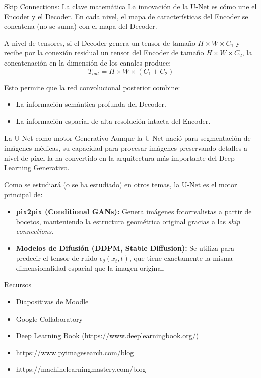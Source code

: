 \begin{frame}{Skip Connections: La clave matemática}
La innovación de la U-Net es cómo une el Encoder y el Decoder. En cada nivel, el mapa de características del Encoder se \alert{concatena} (no se suma) con el mapa del Decoder.

A nivel de tensores, si el Decoder genera un tensor de tamaño $H \times W \times C_1$ y recibe por la conexión residual un tensor del Encoder de tamaño $H \times W \times C_2$, la concatenación en la dimensión de los canales produce:
\begin{equation}
    T_{out} = H \times W \times (C_1 + C_2)
\end{equation}

Esto permite que la red convolucional posterior combine:
\begin{itemize}
    \item La información \alert{semántica profunda} del Decoder.
    \item La información \alert{espacial de alta resolución} intacta del Encoder.
\end{itemize}
\end{frame}

\begin{frame}{La U-Net como motor Generativo}
Aunque la U-Net nació para segmentación de imágenes médicas, su capacidad para procesar imágenes preservando detalles a nivel de píxel la ha convertido en la arquitectura más importante del \alert{Deep Learning Generativo}.

Como se estudiará (o se ha estudiado) en otros temas, la U-Net es el motor principal de:
\begin{itemize}
    \item \textbf{pix2pix (Conditional GANs):} Genera imágenes fotorrealistas a partir de bocetos, manteniendo la estructura geométrica original gracias a las \textit{skip connections}.
    \item \textbf{Modelos de Difusión (DDPM, Stable Diffusion):} Se utiliza para predecir el tensor de ruido $\epsilon_\theta(x_t, t)$, que tiene exactamente la misma dimensionalidad espacial que la imagen original.
\end{itemize}
\end{frame}


\begin{frame}{Recursos}
\begin{itemize}
    \item Diapositivas de Moodle
    \item Google Collaboratory
    \item Deep Learning Book (https://www.deeplearningbook.org/)
    \item https://www.pyimagesearch.com/blog
    \item https://machinelearningmastery.com/blog
\end{itemize}
\end{frame}


